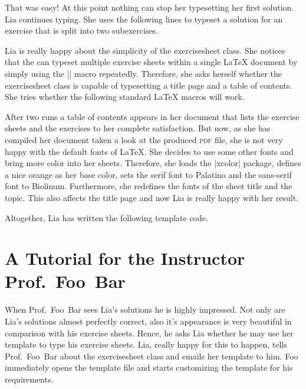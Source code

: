 \documentclass[a4paper,fleqn,9pt]{report}
\def\exercisesheet{{exercisesheet}}
\begin{document}
That was easy! At this point nothing can stop her typesetting her
first solution. Lia continues typing. She uses the following lines to
typeset a solution for an exercise that is split into two
subexercises.



Lia is really happy about the simplicity of the \exercisesheet{}
class. She notices that the can typeset multiple exercise sheets
within a single \LaTeX{} document by simply using the
|\sheet| macro repeatedly. Therefore, she asks herself
whether the \exercisesheet{} class is capable of typesetting a
title page and a table of contents. She tries whether the following
standard \LaTeX{} macros will work.



After two runs a table of contents appears in her document that lists
the exercise sheets and the exercises to her complete satisfaction.
But now, as she has compiled her document taken a look at the produced
\textsc{pdf} file, she is not very happy with the default fonts of
\LaTeX{}. She decides to use some other fonts and bring more color
into her sheets. Therefore, she loads the |xcolor| package,
defines a nice orange as her base color, sets the serif font to
Palatino and the sans-serif font to Biolinum. Furthermore, she
redefines the fonts of the sheet title and the topic. This also
affects the title page and now Lia is really happy with her result.


Altogether, Lia has written the following template code.




\section{A Tutorial for the Instructor Prof.~Foo~Bar}

When Prof.~Foo~Bar sees Lia's solutions he is highly impressed. Not
only are Lia's solutions almost perfectly correct, also it's
appearance is very beautiful in comparison with his exercise sheets.
Hence, he asks Lia whether he may use her template to type his
exercise sheets. Lia, really happy for this to happen, tells
Prof.~Foo~Bar about the \exercisesheet{} class and emails her template
to him. Foo immediately opens the template file and starts customizing
the template for his requirements.
\end{document}
